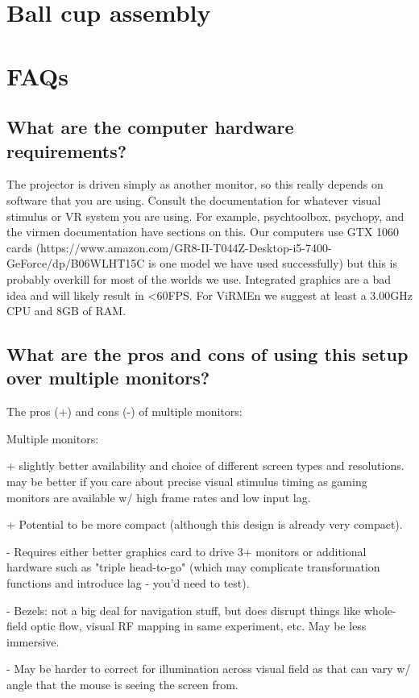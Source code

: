 \documentclass[letter]{article}
\begin{document}
\section{Ball cup assembly}

\section{FAQs}
\subsection{What are the computer hardware requirements?}
The projector is driven simply as another monitor, so this really depends on software that you are using. Consult the documentation for whatever visual stimulus or VR system you are using. For example, psychtoolbox, psychopy, and the virmen documentation have sections on this. Our computers use GTX 1060 cards (https://www.amazon.com/GR8-II-T044Z-Desktop-i5-7400-GeForce/dp/B06WLHT15C is one model we have used successfully) but this is probably overkill for most of the worlds we use. Integrated graphics are a bad idea and will likely result in <60FPS. For ViRMEn we suggest at least a 3.00GHz CPU and 8GB of RAM. 

\subsection{What are the pros and cons of using this setup over multiple monitors?}
The pros (+) and cons (-) of multiple monitors:

Multiple monitors:

+ slightly better availability and choice of different screen types and resolutions. may be better if you care about precise visual stimulus timing as gaming monitors are available w/ high frame rates and low input lag.

+ Potential to be more compact (although this design is already very compact).

- Requires either better graphics card to drive 3+ monitors or additional hardware such as "triple head-to-go" (which may complicate transformation functions and introduce lag - you'd need to test). 

- Bezels: not a big deal for navigation stuff, but does disrupt things like whole-field optic flow, visual RF mapping in same experiment, etc. May be less immersive.

- May be harder to correct for illumination across visual field as that can vary w/ angle that the mouse is seeing the screen from.
\end{document}
